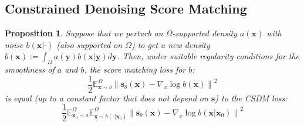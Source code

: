 \documentclass{article}
\theoremstyle{plain}
\newtheorem{proposition}[theorem]{Proposition}
\theoremstyle{definition}
\theoremstyle{remark}
\newcommand{\E}{\mathbb{E}}
\newcommand{\norm}[1]{\left\|#1\right\|}
\newcommand{\grad}{\nabla}
\renewcommand{\vec}{\mathbf}
\begin{document}
\subsection{Constrained Denoising Score Matching}\label{sec:app:theory:cdsm}

\begin{proposition}\label{prop:app:cdsm}
    Suppose that we perturb an $\Omega$-supported density $a(\vec{x})$ with noise $b(\vec{x} | \cdot)$ (also supported on $\Omega$) to get a new density $b(\vec{x}) := \int_\Omega a(\vec{y}) b(\vec{x} | \vec{y}) d\vec{y}$. Then, under suitable regularity conditions for the smoothness of $a$ and $b$, the score matching loss for $b$:
    \begin{equation}\label{eqn:app:pertbsm}
        \frac{1}{2} \E_{\vec{x} \sim b}^\Omega \norm{\vec{s}_\theta(\vec{x}) - \grad_x \log b(\vec{x})}^2
    \end{equation}
    is equal (up to a constant factor that does not depend on $\vec{s}$) to the CSDM loss:
    \begin{equation}\label{eqn:app:pertcdsm}
        \frac{1}{2} \E_{\vec{x}_0 \sim a}^\Omega \E_{\vec{x} \sim b(\cdot | \vec{x}_0)}^\Omega \norm{\vec{s}_\theta(\vec{x}) - \grad_x \log b(\vec{x} | \vec{x}_0)}^2
    \end{equation}
\end{proposition}
\end{document}

